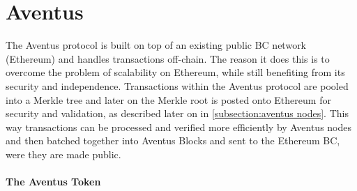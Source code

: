 
\section{Aventus}

\begin{comment}
\subsection{Problems}
\paragraph{Oversight}

The main problem here is defined as a lack of oversight over digital assets from the issuer of these assets/. Oversight is this context is defined as the ability for an issuer see exactly what is happening to their asset at any given moment in order to derive increased value from their digital assets.

\paragraph{Control}

Control allows an issuer to protect the value of their digital assets. In order to achieve total control, the issuer needs control over how their assets are created, managed, and sold.

A lack of control can lead to problems such as distribution of fake copies, price inflation in reselling markets, distribution by unauthorised vendors.
\end{comment}

The Aventus protocol is built on top of an existing public BC network (Ethereum) and handles transactions off-chain. The reason it does this is to overcome the problem of scalability on Ethereum, while still benefiting from its security and independence.
Transactions within the Aventus protocol are pooled into a Merkle tree and later on the Merkle root is posted onto Ethereum for security and validation, as described later on in \ref{subsection:aventus nodes}.
This way transactions can be processed and verified more efficiently by Aventus nodes and then batched together into Aventus Blocks and sent to the Ethereum BC, were they are made public.

\paragraph{The Aventus Token}

